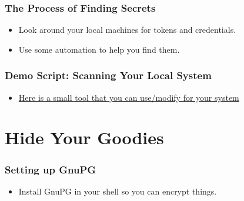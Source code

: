 \documentclass[aspectratio=169]{beamer}
\makeatletter
\def\sectionsubtitle#1{\gdef\@sectionsubtitle{#1}}
\gdef\@sectionsubtitle{}
\makeatother
\begin{document}
\begin{frame}
	\frametitle{The Process of Finding Secrets}
	\begin{itemize}
		\item Look around your local machines for tokens and credentials.
		\item Use some automation to help you find them.
	\end{itemize}
\end{frame}

\begin{frame}
	\frametitle{Demo Script: Scanning Your Local System}
	\begin{itemize}
        \item\href{ https://github.com/devsecfranklin/stash-house/tree/main/demo/01_scanner}{Here is a small tool that you can use/modify for your system}
	\end{itemize}
\end{frame}

\sectionsubtitle{We found the secrets, now what?}
\section{Hide Your Goodies}

\begin{frame}
    \frametitle{Setting up GnuPG}
    \begin{itemize}
        \item Install GnuPG in your shell so you can encrypt things.
    \end{itemize}
\end{frame}
\end{document}
